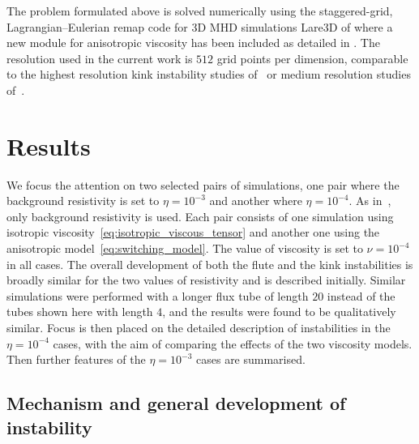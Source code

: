 \documentclass[fleqn,usenatbib]{mnras}
\newcommand{\rs}[2]{{#2}}
\begin{document}
\rs{}{The problem formulated above is solved numerically using the
  staggered-grid, Lagrangian–Eulerian remap code for 3D MHD
  simulations Lare3D of \cite{arberStaggeredGridLagrangian2001} where
  a  new module for anisotropic viscosity has been
  included as detailed in \citep{quinnKelvinHelmholtzInstabilityCollapse2021}.} The resolution used in the
current work is  $512$ grid points per dimension, comparable to the
highest resolution kink instability studies
of~\cite{hoodCoronalHeatingMagnetic2009} or medium resolution studies
of~\cite{barefordShockHeatingNumerical2015}. 

\section{Results}
\label{sec-results}

\rs{Two pairs of simulations were performed,}{We focus the attention
on two selected pairs of  
simulations, one pair where the background resistivity is set to
$\eta=10^{-3}$ and another where $\eta=10^{-4}$. As
in~\citep{quinnEffectAnisotropicViscosity2020}, only background
resistivity is used. Each pair consists of one simulation
using isotropic viscosity~\eqref{eq:isotropic_viscous_tensor} and
another one using the \rs{switching}{anisotropic} model~\eqref{eq:switching_model}. The
value of viscosity is set to $\nu = 10^{-4}$ in all cases.} 
%
The overall development of both \rs{}{the flute and the kink}
instabilities is broadly similar for the two values of resistivity and
is described  initially. Similar simulations were performed with a longer flux tube of length $20$ instead of the tubes shown here with length $4$, and the results were found to be qualitatively similar. Focus is 
then placed on the \rs{development of}{detailed description of instabilities in} the
$\eta=10^{-4}$ cases, \rs{comparing the results}{with the aim of comparing the effects} of the two
viscosity models. \rs{These cases illustrate the development of the instabilities while showcasing the effect of the
viscosity models.}{} Then \rs{differences apparent in}{further features of} the $\eta=10^{-3}$
cases are summarised. \rs{without a full exploration of the (qualitatively
similar) results.}{}

\subsection{\rs{Overview of instability development}{Mechanism and
    general development of instability}}
\end{document}
